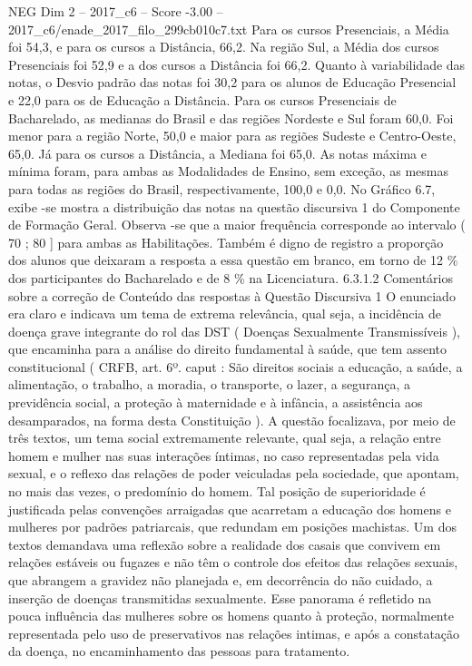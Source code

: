 \begin{textsample}{NEG Dim 2 – 2017\_c6 – Score -3.00 – 2017\_c6/enade\_2017\_filo\_299cb010c7.txt}
Para os cursos Presenciais, a Média foi 54,3, e para os cursos a Distância, 66,2.
Na região Sul, a Média dos cursos Presenciais foi 52,9 e a dos cursos a Distância foi 66,2.
Quanto à variabilidade das notas, o Desvio padrão das notas foi 30,2 para os alunos de Educação Presencial e 22,0 para os de Educação a Distância.
Para os cursos Presenciais de Bacharelado, as medianas do Brasil e das regiões Nordeste e Sul foram 60,0.
Foi menor para a região Norte, 50,0 e maior para as regiões Sudeste e Centro-Oeste, 65,0.
Já para os cursos a Distância, a Mediana foi 65,0.
As notas máxima e mínima foram, para ambas as Modalidades de Ensino, sem exceção, as mesmas para todas as regiões do Brasil, respectivamente, 100,0 e 0,0.
No Gráfico 6.7, exibe -se mostra a distribuição das notas na questão discursiva 1 do Componente de Formação Geral.
Observa -se que a maior frequência corresponde ao intervalo ( 70 ; 80 ] para ambas as Habilitações.
Também é digno de registro a proporção dos alunos que deixaram a resposta a essa questão em branco, em torno de 12 \% dos participantes do Bacharelado e de 8 \% na Licenciatura. 6.3.1.2 Comentários sobre a correção de Conteúdo das respostas à Questão Discursiva 1 O enunciado era claro e indicava um tema de extrema relevância, qual seja, a incidência de doença grave integrante do rol das DST ( Doenças Sexualmente Transmissíveis ), que encaminha para a análise do direito fundamental à saúde, que tem assento constitucional ( CRFB, art. 6º. caput : São direitos sociais a educação, a saúde, a alimentação, o trabalho, a moradia, o transporte, o lazer, a segurança, a previdência social, a proteção à maternidade e à infância, a assistência aos desamparados, na forma desta Constituição ).
A questão focalizava, por meio de três textos, um tema social extremamente relevante, qual seja, a relação entre homem e mulher nas suas interações íntimas, no caso representadas pela vida sexual, e o reflexo das relações de poder veiculadas pela sociedade, que apontam, no mais das vezes, o predomínio do homem.
Tal posição de superioridade é justificada pelas convenções arraigadas que acarretam a educação dos homens e mulheres por padrões patriarcais, que redundam em posições machistas.
Um dos textos demandava uma reflexão sobre a realidade dos casais que convivem em relações estáveis ou fugazes e não têm o controle dos efeitos das relações sexuais, que abrangem a gravidez não planejada e, em decorrência do não cuidado, a inserção de doenças transmitidas sexualmente.
Esse panorama é refletido na pouca influência das mulheres sobre os homens quanto à proteção, normalmente representada pelo uso de preservativos nas relações intimas, e após a constatação da doença, no encaminhamento das pessoas para tratamento.

\end{textsample}
